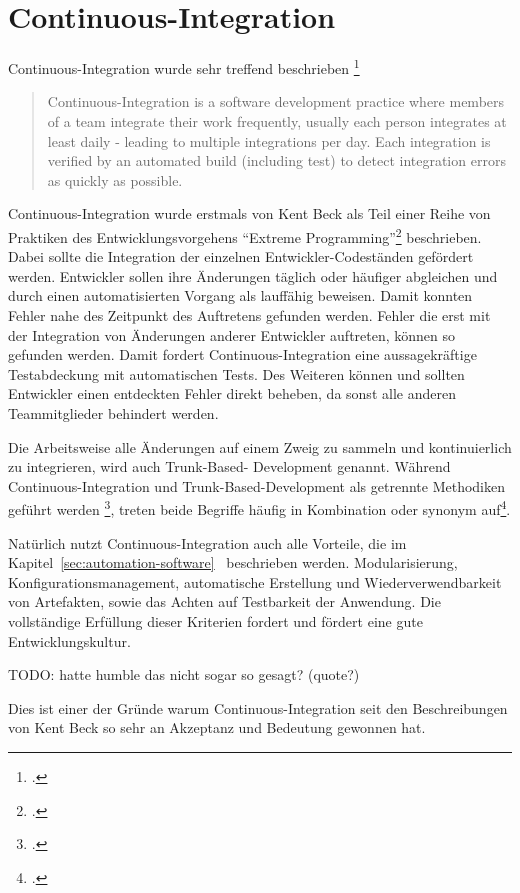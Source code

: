 \section{Continuous-Integration}

Continuous-Integration wurde sehr treffend beschrieben \footcite{fowler2006}

\blockquote {Continuous-Integration is a software development practice where members of a team integrate their work 
frequently, usually each person integrates at least daily - leading to multiple integrations per day. Each integration is 
verified by an automated build (including test) to detect integration errors as quickly as possible.}

Continuous-Integration wurde erstmals von Kent Beck als Teil einer Reihe von Praktiken des Entwicklungsvorgehens ``Extreme Programming''\footcite{kent1999} beschrieben. Dabei sollte die Integration der einzelnen Entwickler-Codeständen gefördert werden. Entwickler sollen ihre Änderungen täglich oder häufiger abgleichen und durch einen automatisierten Vorgang als lauffähig beweisen. Damit konnten Fehler nahe des Zeitpunkt des Auftretens gefunden werden. Fehler die erst mit der Integration von Änderungen anderer Entwickler auftreten, können so gefunden werden. Damit fordert Continuous-Integration eine aussagekräftige Testabdeckung mit automatischen Tests. Des Weiteren können und sollten Entwickler einen entdeckten Fehler direkt beheben, da sonst alle anderen Teammitglieder behindert werden.

Die Arbeitsweise alle Änderungen auf einem Zweig zu sammeln und kontinuierlich zu integrieren, wird auch Trunk-Based-
Development genannt. Während Continuous-Integration und Trunk-Based-Development als getrennte Methodiken geführt werden
\footcite{trunkbaseddevelopment}, treten beide Begriffe häufig in Kombination oder synonym 
auf\footcite{fowler-feature-branch}.

Natürlich nutzt Continuous-Integration auch alle Vorteile, die im 
Kapitel~\ref{sec:automation-software}~ beschrieben werden. Modularisierung, 
Konfigurationsmanagement, automatische Erstellung und Wiederverwendbarkeit von Artefakten, sowie das Achten auf 
Testbarkeit der Anwendung. Die vollständige Erfüllung dieser Kriterien fordert und fördert eine gute Entwicklungskultur.

TODO: hatte humble das nicht sogar so gesagt? (quote?)
 
Dies ist einer der Gründe warum Continuous-Integration seit den Beschreibungen 
von Kent Beck so sehr an Akzeptanz und Bedeutung gewonnen hat.

